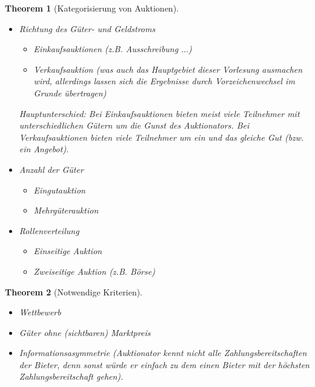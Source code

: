 \documentclass[12pt]{extreport} %
\theoremstyle{named}
\theoremstyle{nnamed}
\newtheorem*{unnamedtheorem*}{Theorem}
\theoremstyle{itshape}
\theoremstyle{normal}
\begin{document}
\begin{unnamedtheorem*}[Kategorisierung von Auktionen] ~\
	\begin{itemize}
		\item Richtung des Güter- und Geldstroms
			\begin{itemize}
				\item Einkaufsauktionen (z.B. Ausschreibung $\dotsc$)
				\item Verkaufsauktion (was auch das Hauptgebiet dieser Vorlesung ausmachen wird, allerdings lassen sich die Ergebnisse durch Vorzeichenwechsel im Grunde übertragen)
			\end{itemize}
			Hauptunterschied: Bei Einkaufsauktionen bieten meist viele Teilnehmer mit unterschiedlichen Gütern um die Gunst des Auktionators.
			Bei Verkaufsauktionen bieten viele Teilnehmer um ein und das gleiche Gut (bzw. ein Angebot).
		\item Anzahl der Güter
			\begin{itemize}
				\item Eingutauktion
				\item Mehrgüterauktion
			\end{itemize}
		\item Rollenverteilung
			\begin{itemize}
				\item Einseitige Auktion
				\item Zweiseitige Auktion (z.B. Börse)
			\end{itemize}
	\end{itemize}
\end{unnamedtheorem*}

\begin{unnamedtheorem*}[Notwendige Kriterien] ~\
	\begin{itemize}
		\item Wettbewerb
		\item Güter ohne (sichtbaren) Marktpreis
		\item Informationsasymmetrie (Auktionator kennt nicht alle Zahlungsbereitschaften der Bieter, denn sonst würde er einfach zu dem einen Bieter mit der höchsten Zahlungsbereitschaft gehen).
	\end{itemize}
\end{unnamedtheorem*}
\end{document}
